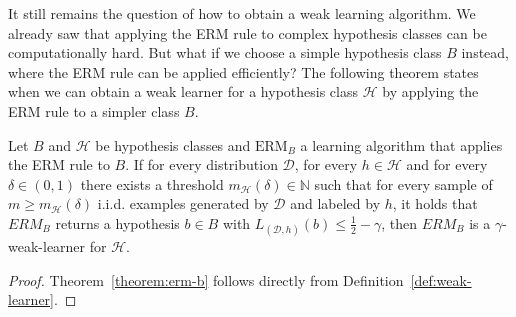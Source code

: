 It still remains the question of how to obtain a weak learning algorithm.
We already saw that applying the ERM rule to complex hypothesis classes can be computationally hard.
But what if we choose a simple hypothesis class $B$ instead, where the ERM rule can be applied efficiently?
The following theorem states when we can obtain a weak learner for a hypothesis class $\mathcal{H}$ by
applying the ERM rule to a simpler class $B$.

\begin{theorem}
\label{theorem:erm-b}
Let $B$ and $\mathcal{H}$ be hypothesis classes and $\text{ERM}_B$ a learning algorithm that applies the ERM rule to $B$.
If for every distribution $\mathcal{D}$, for every $h \in \mathcal{H}$ and for every $\delta \in (0, 1)$
there exists a threshold $m_\mathcal{H}(\delta) \in \mathbb{N}$ such that for every sample
of $m \geq m_\mathcal{H}(\delta)$ i.i.d. examples generated by $\mathcal{D}$ and labeled by $h$, it holds that
$ERM_B$ returns a hypothesis $b \in B$ with $L_{(\mathcal{D}, h)}(b) \leq \frac{1}{2} - \gamma$,
then $ERM_B$ is a $\gamma$-weak-learner for $\mathcal{H}$.
\end{theorem}

\begin{proof}
	Theorem~\ref{theorem:erm-b} follows directly from Definition~\ref{def:weak-learner}.
\end{proof}
